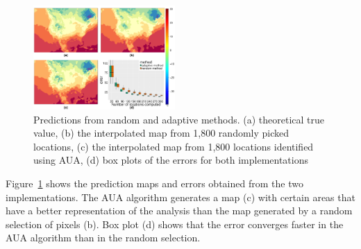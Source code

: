 \begin{figure} 
\includegraphics[width=0.48\textwidth]{figs/EX_PSU_error_plot_2x2.pdf}
\caption{Predictions from random and adaptive methods. (a) theoretical true 
value, (b) the interpolated map from 1,800 randomly picked locations, (c) the 
interpolated map from 1,800 locations identified using AUA, (d) box plots of the
errors for both implementations}\label{fig:anen}
\end{figure}

Figure~\ref{fig:anen} shows the prediction maps and errors obtained from the two
implementations. The AUA algorithm generates a map (c) with certain 
areas that have a better representation of the analysis than the map generated 
by a random selection of pixels (b). Box plot (d) shows that the error converges 
faster in the AUA algorithm than in the random selection.